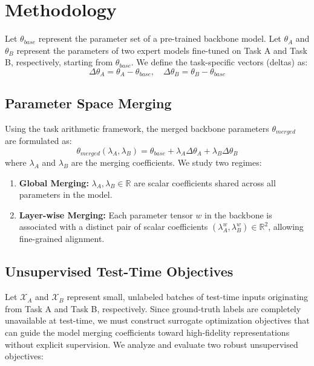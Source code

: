 \documentclass{article}
\theoremstyle{plain}
\theoremstyle{definition}
\theoremstyle{remark}
\begin{document}
\section{Methodology}
\label{sec:method}

Let $\theta_{base}$ represent the parameter set of a pre-trained backbone model. Let $\theta_A$ and $\theta_B$ represent the parameters of two expert models fine-tuned on Task A and Task B, respectively, starting from $\theta_{base}$. We define the task-specific vectors (deltas) as:
\begin{equation}
    \Delta \theta_A = \theta_A - \theta_{base}, \quad \Delta \theta_B = \theta_B - \theta_{base}
\end{equation}

\subsection{Parameter Space Merging}
Using the task arithmetic framework, the merged backbone parameters $\theta_{merged}$ are formulated as:
\begin{equation}
    \theta_{merged}(\lambda_A, \lambda_B) = \theta_{base} + \lambda_A \Delta \theta_A + \lambda_B \Delta \theta_B
\end{equation}
where $\lambda_A$ and $\lambda_B$ are the merging coefficients. We study two regimes:
\begin{enumerate}
    \item \textbf{Global Merging:} $\lambda_A, \lambda_B \in \mathbb{R}$ are scalar coefficients shared across all parameters in the model.
    \item \textbf{Layer-wise Merging:} Each parameter tensor $w$ in the backbone is associated with a distinct pair of scalar coefficients $(\lambda_A^w, \lambda_B^w) \in \mathbb{R}^2$, allowing fine-grained alignment.
\end{enumerate}

\subsection{Unsupervised Test-Time Objectives}
Let $\mathcal{X}_{A}$ and $\mathcal{X}_{B}$ represent small, unlabeled batches of test-time inputs originating from Task A and Task B, respectively. Since ground-truth labels are completely unavailable at test-time, we must construct surrogate optimization objectives that can guide the model merging coefficients toward high-fidelity representations without explicit supervision. We analyze and evaluate two robust unsupervised objectives:
\end{document}
